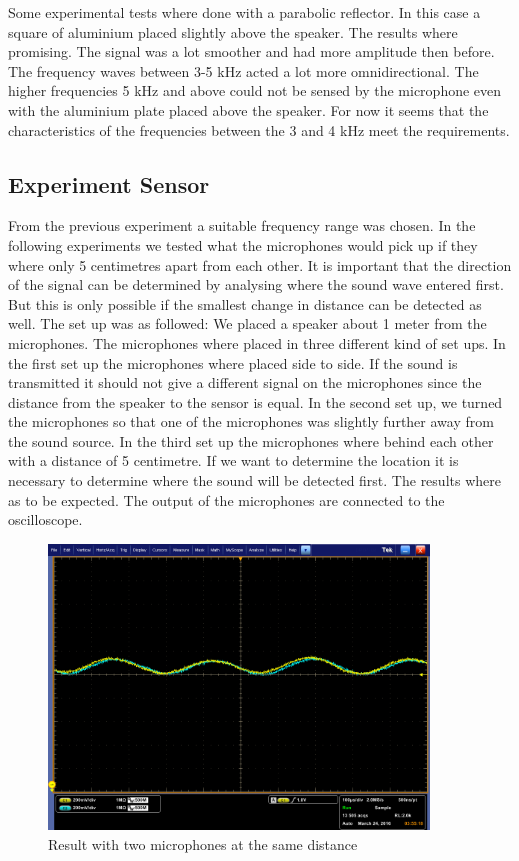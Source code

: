 \documentclass[10pt,a4paper]{article}
\begin{document}
Some experimental tests where done with a parabolic reflector. In this case a square of aluminium placed slightly above the speaker. The results where promising. The signal was a lot smoother and had more amplitude then before. The frequency waves between 3-5 kHz acted a lot more omnidirectional. The higher frequencies 5 kHz and above could not be sensed by the microphone even with the aluminium plate placed above the speaker. For now it seems that the characteristics of the frequencies between the 3 and 4 kHz meet the requirements.

\subsection{Experiment Sensor}

From the previous experiment a suitable frequency range was chosen. In the following experiments we tested what the microphones would pick up if they where only 5 centimetres apart from each other. It is important that the direction of the signal can be determined by analysing where the sound wave entered first. But this is only possible if the smallest change in distance can be detected as well. 
The set up was as followed: We placed a speaker about 1 meter from the microphones. The microphones where placed in three different kind of set ups. In the first set up the microphones where placed side to side. If the sound is transmitted it should not give a different signal on the microphones since the distance from the speaker to the sensor is equal. 
In the second set up, we turned the microphones so that one of the microphones was slightly further away from the sound source. In the third set up the microphones where behind each other with a distance of 5 centimetre. If we want to determine the location it is necessary to determine where the sound will be detected first.  
The results where as to be expected. The output of the microphones are connected to the oscilloscope. 

\begin{figure}[H]
\centering
\includegraphics[width=0.9\textwidth]{experiment1.png}
\caption{Result with two microphones at the same distance} 
\label{experiment1}
\end{figure}
\end{document}
